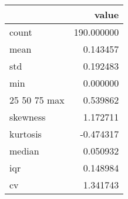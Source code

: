 \begin{tabular}{lr}
\toprule
 & value \\
\midrule
count & 190.000000 \\
mean & 0.143457 \\
std & 0.192483 \\
min & 0.000000 \\
25%
50%
75%
max & 0.539862 \\
skewness & 1.172711 \\
kurtosis & -0.474317 \\
median & 0.050932 \\
iqr & 0.148984 \\
cv & 1.341743 \\
\bottomrule
\end{tabular}
